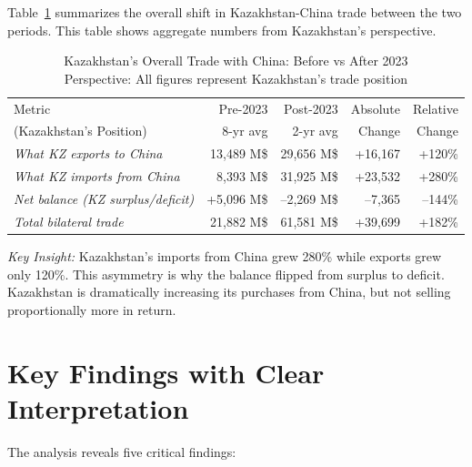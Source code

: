 \documentclass[12pt]{article}
\begin{document}
Table~\ref{tab:summary} summarizes the overall shift in Kazakhstan-China trade between the two periods. This table shows aggregate numbers from Kazakhstan's perspective.

\begin{table}[H]
\centering
\small
\caption{Kazakhstan's Overall Trade with China: Before vs After 2023 \\
Perspective: All figures represent Kazakhstan's trade position}
\label{tab:summary}
\begin{tabular}{lrrrr}
\toprule
Metric & Pre-2023 & Post-2023 & Absolute & Relative \\
(Kazakhstan's Position) & 8-yr avg & 2-yr avg & Change & Change \\
\midrule
\textit{What KZ exports to China} & 13,489 M\$ & 29,656 M\$ & +16,167 & +120\% \\
\textit{What KZ imports from China} & 8,393 M\$ & 31,925 M\$ & +23,532 & +280\% \\
\textit{Net balance (KZ surplus/deficit)} & +5,096 M\$ & --2,269 M\$ & --7,365 & --144\% \\
\textit{Total bilateral trade} & 21,882 M\$ & 61,581 M\$ & +39,699 & +182\% \\
\bottomrule
\end{tabular}
\footnotesize
\emph{Key Insight:} Kazakhstan's imports from China grew 280\% while exports grew only 120\%. This asymmetry is why the balance flipped from surplus to deficit. Kazakhstan is dramatically increasing its purchases from China, but not selling proportionally more in return.
\end{table}

\section{Key Findings with Clear Interpretation}

The analysis reveals five critical findings:
\end{document}
